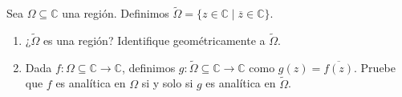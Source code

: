 \documentclass[../main.tex]{subfiles}
\begin{document}
\begin{problema}
    Sea \(\Omega \subseteq \mathbb{C}\) una región. Definimos \(\tilde{\Omega} =
    \{z\in \mathbb{C} \mid \overline{z}\in \mathbb{C}\}\).

    \begin{enumerate}
        \item ¿\(\tilde{\Omega}\) es una región? Identifique geométricamente a
            \(\tilde{\Omega}\).
        \item Dada \(f \colon \Omega \subseteq \mathbb{C} \to \mathbb{C}\),
            definimos \(g
            \colon \tilde{\Omega} \subseteq \mathbb{C} \to \mathbb{C}\) como \(g(z) =
            \overline{f(z)}\). Pruebe que \(f\) es analítica en \(\Omega\) si
            y solo si \(g\)
            es analítica en \(\tilde{\Omega}\).
    \end{enumerate}
\end{problema}
\end{document}

